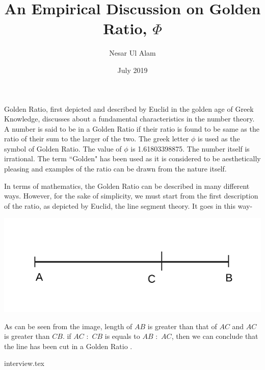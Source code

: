 \documentclass[12pt]{extarticle}
\title{An Empirical Discussion on Golden Ratio, $\Phi$}
\author{Nesar Ul Alam}
\date{July 2019}
\begin{document}
\maketitle

Golden Ratio, first depicted and described by Euclid in the golden age of Greek Knowledge, discusses about a fundamental characteristics in the number theory. A number is said to be in a Golden Ratio if their ratio is found to be same as the ratio of their sum to the larger of the two. The greek letter $\phi$ is used as the symbol of Golden Ratio. The value of $\phi$ is 1.61803398875. The number itself is irrational. The term ``Golden" has been used as it is considered to be aesthetically pleasing and examples of the ratio can be drawn from the nature itself.

In terms of mathematics, the Golden Ratio can be described in many different ways. However, for the sake of simplicity, we must start from the first description of the ratio, as depicted by Euclid, the line segment theory. It goes in this way- 

\includegraphics[]{ffUntitled.png}

As can be seen from the image, length of $AB$ is greater than that of $AC$ and $AC$ is greater than $CB$. if $AC$ $:$ $CB$ is equals to $AB$ $:$ $AC$, then we can conclude that the line has been cut in a Golden Ratio \cite{livio2008golden}. \newline



{interview.tex}


\end{document}

